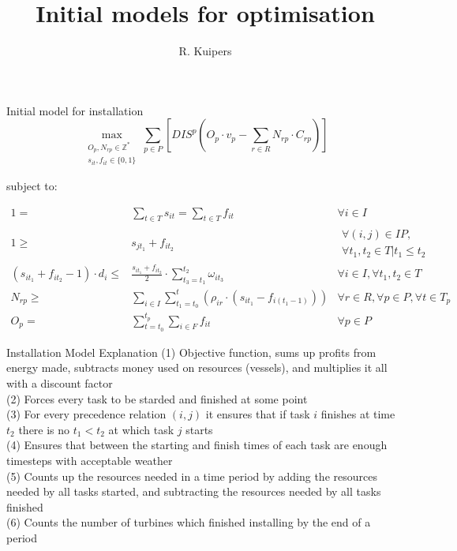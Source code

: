 \documentclass{beamer}
\title[Initial models for optimisation]{Initial models for optimisation}
\author{R. Kuipers}
\begin{document}
\begin{frame}
  \titlepage
\end{frame}

\begin{frame}{Initial model for installation}
\footnotesize
\begin{equation}
	\max_{\substack{O_p, N_{rp} \in \mathbb{Z}^* \\ s_{it}, f_{it} \in \{0, 1\}}} \sum_{p \in P} [ DIS^p (O_p \cdot v_p - \sum_{r \in R} N_{rp} \cdot C_{rp}) ]
\end{equation}

\bigskip
subject to:

\begin{align}
1 =& \sum_{t \in T} s_{it}	= \sum_{t \in T} f_{it}										&	\forall i \in I 						\\
1 \geq& s_{jt_1} + f_{it_2}											&	\begin{aligned} \forall (i, j) \in IP, \\
																	\forall t_1, t_2 \in T | t_1 \leq t_2 \end{aligned} \\
(s_{it_1} + f_{it_2} - 1) \cdot d_i \leq& \frac{s_{it_1} + f_{it_2}}{2} \cdot \sum_{t_3 = t_1}^{t_2} \omega_{it_3} 		& \forall i \in I, \forall t_1, t_2 \in T	\\
N_{rp} \geq& \sum_{i\in I} \sum_{t_1 = t_0}^t (\rho_{ir} \cdot (s_{it_1} - f_{i(t_1-1)}))			& \forall r \in R, \forall p \in P, \forall t \in T_p 	\\
O_p =&  \sum_{t = t_0}^{t_p} \sum_{i \in F} f_{it}									& \forall p \in P
\end{align}

\end{frame}

\begin{frame}{Installation Model Explanation}
(1) Objective function, sums up profits from energy made, subtracts money used on resources (vessels), and multiplies it all with a discount factor	\\
(2) Forces every task to be starded and finished at some point	\\
(3) For every precedence relation $(i, j)$ it ensures that if task $i$ finishes at time $t_2$ there is no $t_1 < t_2$ at which task $j$ starts 	\\
(4) Ensures that between the starting and finish times of each task are enough timesteps with acceptable weather	\\
(5) Counts up the resources needed in a time period by adding the resources needed by all tasks started, and subtracting the resources needed by all tasks finished	\\
(6) Counts the number of turbines which finished installing by the end of a period	
\end{frame}
\end{document}

